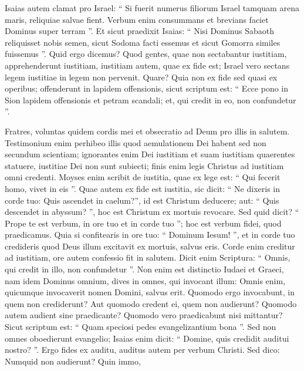 \begin{biblechapter}
\begin{biblechapter}
\begin{biblechapter}
\begin{biblechapter}
\begin{biblechapter}
\begin{biblechapter}
\begin{biblechapter}
\begin{biblechapter}
\begin{biblechapter}
 \verse Isaias autem clamat pro Israel: “ Si fuerit numerus filiorum Israel tamquam arena maris, reliquiae salvae fient. 
\verse Verbum enim consummans et brevians faciet Dominus super terram ”.
 \verse Et sicut praedixit Isaias:
 “ Nisi Dominus Sabaoth reliquisset nobis semen,
 sicut Sodoma facti essemus
 et sicut Gomorra similes fuissemus ”.
 \verse Quid ergo dicemus? Quod gentes, quae non sectabantur iustitiam, apprehenderunt iustitiam, iustitiam autem, quae ex fide est; 
\verse Israel vero sectans legem iustitiae in legem non pervenit. 
\verse Quare? Quia non ex fide sed quasi ex operibus; offenderunt in lapidem offensionis, 
\verse sicut scriptum est:
 “ Ecce pono in Sion lapidem offensionis et petram scandali;
 et, qui credit in eo, non confundetur ”.
 
\begin{biblechapter}
\verse Fratres, voluntas quidem cordis mei et obsecratio ad Deum pro illis in salutem. 
\verse Testimonium enim perhibeo illis quod aemulationem Dei habent sed non secundum scientiam; 
\verse ignorantes enim Dei iustitiam et suam iustitiam quaerentes statuere, iustitiae Dei non sunt subiecti; 
\verse finis enim legis Christus ad iustitiam omni credenti.
 \verse Moyses enim scribit de iustitia, quae ex lege est: “ Qui fecerit homo, vivet in eis ”. 
\verse Quae autem ex fide est iustitia, sic dicit: “ Ne dixeris in corde tuo: Quis ascendet in caelum?”, id est Christum deducere; 
\verse aut: “ Quis descendet in abyssum? ”, hoc est Christum ex mortuis revocare. 
\verse Sed quid dicit? “ Prope te est verbum, in ore tuo et in corde tuo ”; hoc est verbum fidei, quod praedicamus. 
\verse Quia si confitearis in ore tuo: “ Dominum Iesum! ”, et in corde tuo credideris quod Deus illum excitavit ex mortuis, salvus eris. 
 \verse Corde enim creditur ad iustitiam, ore autem confessio fit in salutem. 
\verse Dicit enim Scriptura:
 “ Omnis, qui credit in illo, non confundetur ”.
 \verse Non enim est distinctio Iudaei et Graeci, nam idem Dominus omnium, dives in omnes, qui invocant illum:
 \verse Omnis enim, quicumque invocaverit nomen Domini, salvus erit.
 \verse Quomodo ergo invocabunt, in quem non crediderunt? Aut quomodo credent ei, quem non audierunt? Quomodo autem audient sine praedicante? 
\verse Quomodo vero praedicabunt nisi mittantur? Sicut scriptum est:
 “ Quam speciosi pedes evangelizantium bona ”.
 \verse Sed non omnes oboedierunt evangelio; Isaias enim dicit:
 “ Domine, quis credidit auditui nostro? ”. 
\verse Ergo fides ex auditu, auditus autem per verbum Christi.
 \verse Sed dico: Numquid non audierunt? Quin immo,

\end{biblechapter}
\end{biblechapter}
\end{biblechapter}
\end{biblechapter}
\end{biblechapter}
\end{biblechapter}
\end{biblechapter}
\end{biblechapter}
\end{biblechapter}
\end{biblechapter}
